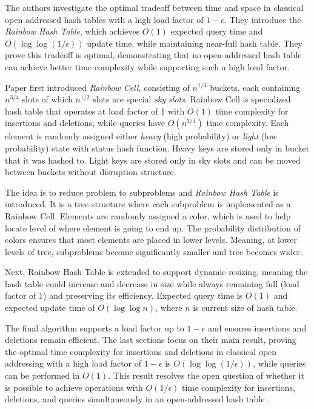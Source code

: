 
The authors investigate the optimal tradeoff between time and space in classical open addressed hash tables with a high load factor of $1 - \epsilon$. They introduce the \textit{Rainbow Hash Table}, which achieves $O(1)$ expected query time and $O(\log\log(1/\epsilon))$ update time, while maintaining near-full hash table. They prove this tradeoff is optimal, demonstrating that no open-addressed hash table can achieve better time complexity while supporting such a high load factor.

Paper first introduced \textit{Rainbow Cell}, consisting of $n^{1/4}$ buckets, each containing $n^{3/4}$ slots of which $n^{1/2}$ slots are special \textit{sky slots}. Rainbow Cell is specialized hash table that operates at load factor of 1 with $O(1)$ time complexity for insertions and deletions, while queries have $O(n^{3/4})$ time complexity. Each element is randomly assigned either \textit{heavy} (high probability) or \textit{light} (low probability) state with status hash function. Heavy keys are stored only in bucket that it was hashed to. Light keys are stored only in sky slots and can be moved between buckets without disruption structure.

The idea is to reduce problem to subproblems and \textit{Rainbow Hash Table} is introduced. It is a tree structure where each subproblem is implemented as a Rainbow Cell. Elements are randomly assigned a color, which is used to help locate level of where element is going to end up. The probability distribution of colors ensures that most elements are placed in lower levels. Meaning, at lower levels of tree, subproblems become significantly smaller and tree becomes wider. 

Next, Rainbow Hash Table is extended to support dynamic resizing, meaning the hash table could increase and decrease in size while always remaining full (load factor of 1) and preserving its efficiency. Expected query time is $O(1)$ and expected update time of $O(\log\log n)$, where $n$ is current size of hash table. 

The final algorithm supports a load factor up to $1 - \epsilon$ and ensures insertions and deletions remain efficient. The last sections focus on their main result, proving the optimal time complexity for insertions and deletions in classical open addressing with a high load factor of $1 - \epsilon$ is $O(\log\log(1/\epsilon))$, while queries can be performed in $O(1)$. This result resolves the open question of whether it is possible to achieve operations with $O(1/\epsilon)$ time complexity for insertions, deletions, and queries simultaneously in an open-addressed hash table \cite{10756082}.